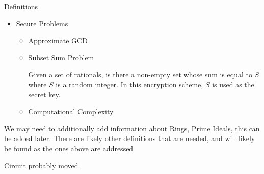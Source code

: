 \documentclass[a0,portrait]{a0poster}
\begin{document}
\begin{multicols}{2}
\begin{slide}{Definitions}
\begin{itemize}
  Re-encrypting already encrypted data using elements from the original encryption circuit.
\begin{itemize}
\item Compact
\item Circular Security
\end{itemize}
\item Secure Problems
\begin{itemize}
\item Approximate GCD
\item Subset Sum Problem 

  Given a set of rationals, is there a non-empty set whose sum is equal to $S$ where $S$ is a random integer. In this encryption scheme, $S$ is used as the secret key.
\item Computational Complexity
\end{itemize}

\end{itemize}


We may need to additionally add information about Rings, Prime Ideals, this can be added later. There are likely other definitions that are needed, and will likely be found as the ones above are addressed
\end{slide}

\begin{slide}{Circuit probably moved}
\begin{multicols}{3}



\end{multicols}
\end{slide}
\end{multicols}
\end{document}
